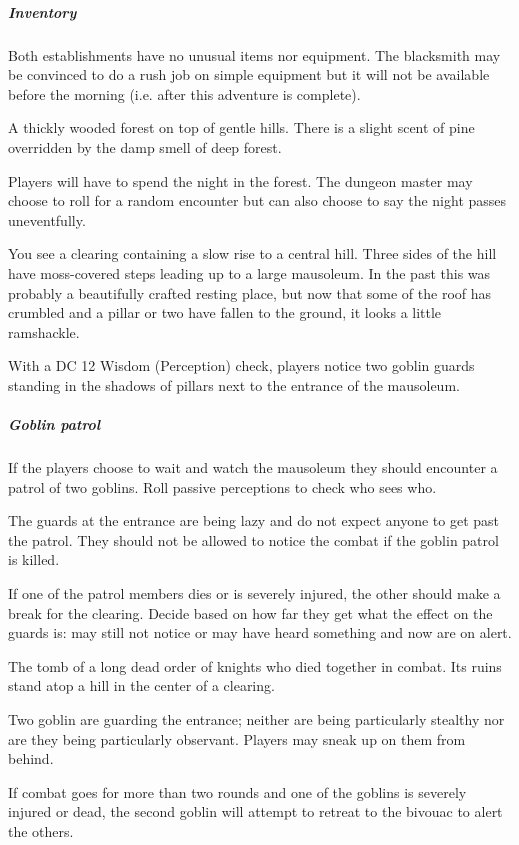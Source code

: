 \documentclass[10pt,twocolumn,openany,nodeprecatedcode,bg=none]{dndbook}
\begin{document}
\subparagraph{Inventory}
Both establishments have no unusual items nor equipment.
The blacksmith may be convinced to do a rush job on simple equipment but it will not be available before the morning (i.e. after this adventure is complete).

A thickly wooded forest on top of gentle hills.
There is a slight scent of pine overridden by the damp smell of deep forest.

Players will have to spend the night in the forest.
The dungeon master may choose to roll for a random encounter but can also choose to say the night passes uneventfully.

\begin{DndReadAloud}
  You see a clearing containing a slow rise to a central hill.
  Three sides of the hill have moss-covered steps leading up to a large mausoleum.
  In the past this was probably a beautifully crafted resting place, but now that some of the roof has crumbled and a pillar or two have fallen to the ground, it looks a little ramshackle.
\end{DndReadAloud}

With a DC 12 Wisdom (Perception) check, players notice two goblin guards standing in the shadows of pillars next to the entrance of the mausoleum.

\subparagraph{Goblin patrol}
If the players choose to wait and watch the mausoleum they should encounter a patrol of two goblins.
Roll passive perceptions to check who sees who.

The guards at the entrance are being lazy and do not expect anyone to get past the patrol.
They should not be allowed to notice the combat if the goblin patrol is killed.

If one of the patrol members dies or is severely injured, the other should make a break for the clearing.
Decide based on how far they get what the effect on the guards is: may still not notice or may have heard something and now are on alert.

The tomb of a long dead order of knights who died together in combat.
Its ruins stand atop a hill in the center of a clearing.

Two goblin are guarding the entrance; neither are being particularly stealthy nor are they being particularly observant.
Players may sneak up on them from behind.

If combat goes for more than two rounds and one of the goblins is severely injured or dead, the second goblin will attempt to retreat to the bivouac to alert the others.
\end{document}
